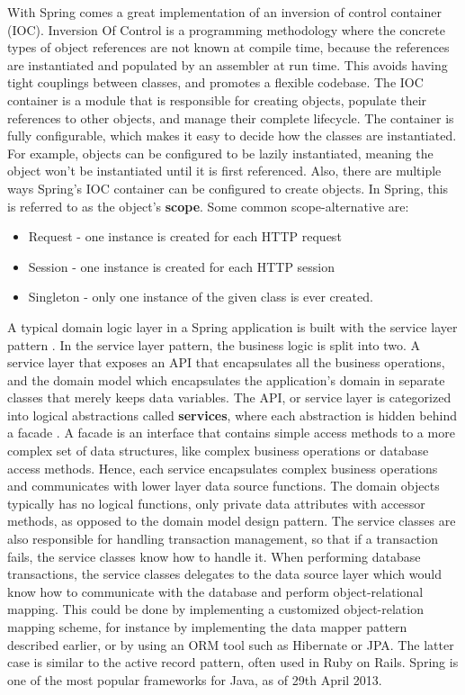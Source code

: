 With Spring comes a great implementation of an inversion of control container (IOC)\cite {dipioc}. Inversion Of Control is a programming methodology where the concrete types of object references are not known at compile time, because the references are instantiated and populated  by an assembler at run time. This avoids having tight couplings between classes, and promotes a flexible codebase. The IOC container is a module that is responsible for creating objects, populate their references  to other objects, and manage their complete lifecycle. The container is fully configurable, which makes it easy to decide how the classes are instantiated. For example, objects can be configured to be lazily instantiated, meaning the object won't be instantiated until it is first referenced. Also, there are multiple ways Spring's IOC container can be configured to create objects. In Spring, this is referred to as the object's \textbf{scope}. Some common scope-alternative are:

\begin{itemize}
\item{} Request - one instance is created for each HTTP request
\item{} Session - one instance is created for each HTTP session
\item{} Singleton - only one instance of the given class is ever created.
\end{itemize}
			
A typical domain logic layer in a Spring application is built with the service layer pattern \cite{serviceLayer}. In the service layer pattern, the business logic is split into two. A service layer that exposes an API that encapsulates all the business operations, and the domain model which encapsulates the application's domain in separate classes that merely keeps data variables. The API, or service layer is categorized into logical abstractions called \textbf{services}, where each abstraction is hidden behind a facade \cite[p. ~158]{facade}. A facade is an interface that contains simple access methods to a more complex set of data structures, like complex business operations or database access methods.  Hence, each service encapsulates complex business operations and communicates with lower layer data source functions. The domain objects typically has no logical functions, only private data attributes with accessor methods, as opposed to the domain model design pattern. The service classes are also responsible for handling transaction management, so that if a transaction fails, the service classes know how to handle it. When performing database transactions, the service classes delegates to the data source layer which would know how to communicate with the database and perform object-relational mapping. This could be done by implementing a customized object-relation mapping scheme, for instance by implementing the data mapper pattern described earlier, or by using an ORM tool such as Hibernate or JPA\cite{jpa}. The latter case is similar to the active record pattern, often used in Ruby on Rails. Spring is one of the most popular frameworks for Java, as of 29th April 2013\cite{popFrameworks}.

